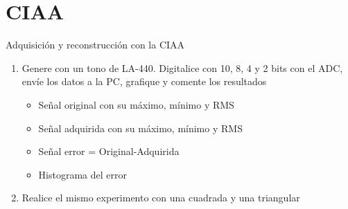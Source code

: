  \section{CIAA}
 \begin{frame}{Adquisición y reconstrucción con la CIAA}
    \begin{enumerate}
       \item{Genere con un tono de LA-440. Digitalice con 10, 8, 4 y 2 bits con el ADC, envíe los datos a la PC, grafique y comente los resultados}
          \begin{itemize}
             \item{Señal original con su máximo, mínimo y RMS }
             \item{Señal adquirida con su máximo, mínimo y RMS }
             \item{Señal error = Original-Adquirida}
             \item{Histograma del error}
          \end{itemize}
       \item{Realice el mismo experimento con una cuadrada y una triangular}
    \end{enumerate}
    \vfill
 \end{frame}
